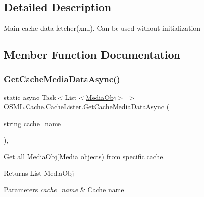 \subsection{Detailed Description}
Main cache data fetcher(xml). Can be used without initialization 



\subsection{Member Function Documentation}
\mbox{\label{classOSML_1_1Cache_1_1CacheLister_a5ea2d67bd366c49b406ad83bc226a75e}} 
\subsubsection{\texorpdfstring{GetCacheMediaDataAsync()}{GetCacheMediaDataAsync()}}
{\footnotesize\ttfamily static async Task$<$List$<$\mbox{\hyperlink{classOSML_1_1Media_1_1MediaObj}{Media\+Obj}}$>$ $>$ O\+S\+M\+L.\+Cache.\+Cache\+Lister.\+Get\+Cache\+Media\+Data\+Async (\begin{DoxyParamCaption}\item[{string}]{cache\+\_\+name }\end{DoxyParamCaption})\hspace{0.3cm}{\ttfamily [inline]}, {\ttfamily [static]}}



Get all Media\+Obj(\+Media objects) from specific cache. 

\begin{DoxyReturn}{Returns}
List Media\+Obj 
\end{DoxyReturn}

\begin{DoxyParams}{Parameters}
{\em cache\+\_\+name} & \mbox{\hyperlink{namespaceOSML_1_1Cache}{Cache}} name\\
\hline
\end{DoxyParams}
\mbox{\label{classOSML_1_1Cache_1_1CacheLister_a027390d43931a6594324d18550da83aa}} 
